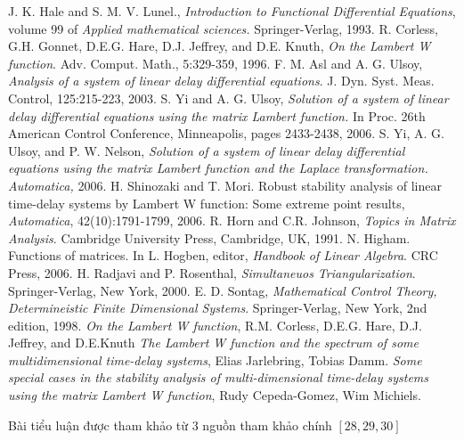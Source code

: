 \begin{thebibliography}{30}
	J. K. Hale and S. M. V. Lunel., \textit{Introduction to Functional Differential Equations}, volume 99 of \textit{Applied mathematical sciences.} Springer-Verlag, 1993.
	R. Corless, G.H. Gonnet, D.E.G. Hare, D.J. Jeffrey, and D.E. Knuth, \textit{On the Lambert W function}. Adv. Comput. Math., 5:329-359, 1996.
	F. M. Asl and A. G. Ulsoy, \textit{Analysis of a system of linear delay differential equations}. J. Dyn. Syst. Meas. Control, 125:215-223, 2003.
	S. Yi and A. G. Ulsoy, \textit{Solution of a system of linear delay differential equations using the matrix Lambert function.} In Proc. 26th American Control Conference, Minneapolis, pages 2433-2438, 2006.
	S. Yi, A. G. Ulsoy, and P. W. Nelson, \textit{Solution of a system of linear delay differential equations using the matrix Lambert function and the Laplace transformation. Automatica,} 2006.
	H. Shinozaki and T. Mori. Robust stability analysis of linear time-delay systems by Lambert W function: Some extreme point results, \textit{Automatica}, 42(10):1791-1799, 2006.
	R. Horn and C.R. Johnson, \textit{Topics in Matrix Analysis}. Cambridge University Press, Cambridge, UK, 1991.
	N. Higham. Functions of matrices. In L. Hogben, editor, \textit{Handbook of Linear Algebra}. CRC Press, 2006.
	H. Radjavi and P. Rosenthal, \textit{Simultaneuos Triangularization}. Springer-Verlag, New York, 2000.
	E. D. Sontag, \textit{Mathematical Control Theory, Determineistic Finite Dimensional Systems}. Springer-Verlag, New York, 2nd edition, 1998. 
	\textit{On the Lambert W function}, R.M. Corless, D.E.G. Hare, D.J. Jeffrey, and D.E.Knuth 
	\textit{The Lambert W function and the spectrum of some multidimensional time-delay systems}, Elias Jarlebring, Tobias Damm. 
	\textit{Some special cases in the stability analysis of multi-dimensional time-delay systems using the matrix Lambert W function}, Rudy Cepeda-Gomez, Wim Michiels.
\end{thebibliography}
Bài tiểu luận được tham khảo từ 3 nguồn tham khảo chính $[28,29,30]$
